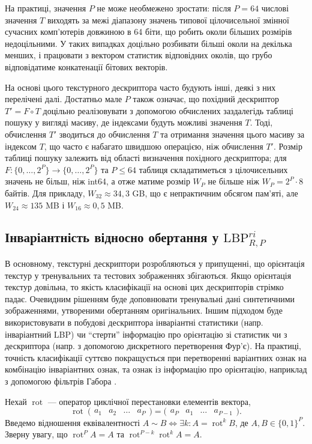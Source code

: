 На практиці, значення $P$ не може необмежено зростати: після $P=64$ числові значення $T$ виходять за межі діапазону значень типової цілочисельної змінної сучасних комп'ютерів довжиною в 64 біти, 
що робить околи більших розмірів недоцільними. У таких випадках доцільно розбивати більші околи на декілька менших, і працювати з вектором статистик відповідних околів,
що грубо відповідатиме конкатенації бітових векторів. 

На основі цього текстурного дескриптора часто будують інші, деякі з них перелічені далі.
Достатньо мале $P$ також означає, що похідний дескриптор $T' = F \circ T$ доцільно реалізовувати з допомогою обчислених заздалегідь таблиці пошуку у вигляді масиву, 
де індексами будуть можливі значення $T$.
Тоді, обчислення $T'$ зводиться до обчислення $T$ та отримання значення цього масиву за індексом $T$, що часто є набагато швидшою операцією, ніж обчислення $T'$.
Розмір таблиці пошуку залежить від області визначення похідного дескриптора; 
для $F \colon \{0,\dots,2^P\} \to \{0,\dots,2^P\}$ та $P\le 64$ таблиця складатиметься з цілочисельних значень не більш, ніж int64, 
а отже матиме розмір $W_P$ не більше ніж $W_P = 2^P \cdot 8$ байтів. 
Для прикладу, $W_{32} \approx 34{,}3$ GB, що є непрактичним обсягом пам'яті, але $W_{24} \approx 135$ MB і $W_{16} \approx 0{,}5$ MB.

\subsection{Інваріантність відносно обертання у \(\mathrm{LBP}_{R,P}^{ri}\)}\label{section1.1c}\hfill

В основному, текстурні дескриптори розробляються у припущенні, що орієнтація текстур у тренувальних та тестових зображеннях збігаються.
Якщо орієнтація текстур довільна, то якість класифікації на основі цих дескрипторів стрімко падає. 
Очевидним рішенням буде доповнювати тренувальні дані синтетичними зображеннями, утвореними обертанням оригінальних. 
Іншим підходом буде використовувати в побудові дескриптора інваріантні статистики (напр. інваріантний LBP) чи 
``стерти'' інформацію про орієнтацію зі статистик чи з дескриптора (напр. з допомогою дискретного перетворення Фур'є). 
На практиці, точність класифікації суттєво покращується при перетворенні варіантних ознак на комбінацію інваріантних ознак, та ознак із інформацію про орієнтацію, наприклад з допомогою фільтрів Габора \cite{guo2010lbpv}. 

Нехай $\operatorname{rot}$ --- оператор циклічної перестановки елементів вектора,
\begin{equation*}
    \operatorname{rot}\ \bigl(\begin{matrix}a_1 & a_2 & \dots  & a_P\end{matrix}\bigr) = \bigl(\begin{matrix}a_P & a_1 & \dots  & a_{P-1}\end{matrix}\bigr).
\end{equation*} 
Введемо відношення еквівалентності $A\sim B \iff \exists k: A = \operatorname{rot}^k B$, де $A,B \in \{0,1\}^P$.
Зверну увагу, що $\operatorname{rot}^P A = A$ та $\operatorname{rot}^{P-k} \operatorname{rot}^k A = A$.

